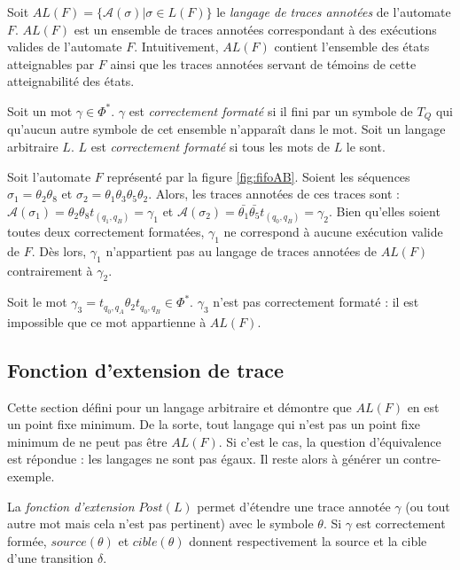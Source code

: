 Soit $AL(F)=\{\mathcal{A}(\sigma)|\sigma \in L(F)\}$ le \emph{langage de traces annotées} de l'automate $F$. $AL(F)$ est un ensemble de traces annotées correspondant à des exécutions valides de l'automate $F$. Intuitivement, $AL(F)$ contient l'ensemble des états atteignables par $F$ ainsi que les traces annotées servant de témoins de cette atteignabilité des états.


Soit un mot $\gamma \in \Phi^*$. $\gamma$ est \emph{correctement formaté} si il fini par un symbole de $T_Q$ qui qu'aucun autre symbole de cet ensemble n'apparaît dans le mot. Soit un langage arbitraire $L$. $L$ est \emph{correctement formaté} si tous les mots de $L$ le sont.


\begin{example}
Soit l'automate $F$ représenté par la figure \ref{fig:fifoAB}. Soient les séquences $\sigma_1=\theta_2\theta_8$ et $\sigma_2=\theta_1\theta_3\theta_5\theta_2$. Alors, les traces annotées de ces traces sont : $\mathcal{A}(\sigma_1)=\theta_2\theta_8t_{(q_1,q_B)}=\gamma_1$ et $\mathcal{A}(\sigma_2)=\bar{\theta_1}\bar{\theta_5}t_{(q_0,q_B)}=\gamma_2$.
Bien qu'elles soient toutes deux correctement formatées, $\gamma_1$ ne correspond à aucune exécution valide de $F$. Dès lors, $\gamma_1$ n'appartient pas au langage de traces annotées de $AL(F)$ contrairement à $\gamma_2$.

Soit le mot $\gamma_3=t_{q_0,q_A}\theta_2 t_{q_0,q_B} \in \Phi^*$. $\gamma_3$ n'est pas correctement formaté : il est impossible que ce mot appartienne à $AL(F)$.
\end{example}


\subsection{Fonction d'extension de trace}\label{ss:extension}

Cette section défini \fl pour un langage arbitraire et démontre que $AL(F)$ en est un point fixe minimum. De la sorte, tout langage qui n'est pas un point fixe minimum de \fl ne peut pas être $AL(F)$. Si c'est le cas, la question d'équivalence est répondue : les langages ne sont pas égaux. Il reste alors à générer un contre-exemple.


La \emph{fonction d'extension} $Post(L)$ permet d'étendre une trace annotée $\gamma$ (ou tout autre mot mais cela n'est pas pertinent) avec le symbole $\theta$. Si $\gamma$ est correctement formée, $source(\theta)$ et $cible(\theta)$ donnent respectivement la source et la cible d'une transition $\delta$.

